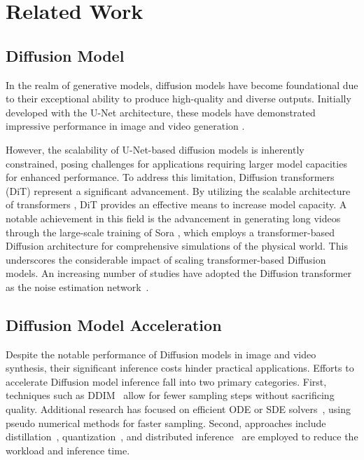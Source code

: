\section{Related Work}
\subsection{Diffusion Model}
%
In the realm of generative models, diffusion models \cite{ho2020denoising, sohl2015deep} have become foundational due to their exceptional ability to produce high-quality and diverse outputs. Initially developed with the U-Net architecture, these models have demonstrated impressive performance in image and video generation \cite{ramesh2022hierarchical, rombach2022high, ho2022video, saharia2022photorealistic, wei2024dreamvideo, wei2024dreamvideo2, wang2023modelscope, chen2023videocrafter1, chen2024videocrafter2}. 
%

However, the scalability of U-Net-based diffusion models is inherently constrained, posing challenges for applications requiring larger model capacities for enhanced performance. To address this limitation, Diffusion transformers (DiT) \cite{peebles2023scalable} represent a significant advancement. By utilizing the scalable architecture of transformers \cite{vaswani2017attention}, DiT provides an effective means to increase model capacity.
%
A notable achievement in this field is the advancement in generating long videos through the large-scale training of Sora \cite{Sora}, which employs a transformer-based Diffusion architecture for comprehensive simulations of the physical world. This underscores the considerable impact of scaling transformer-based Diffusion models.
%
An increasing number of studies have adopted the Diffusion transformer as the noise estimation network~\cite{chen2023pixart, chen2024pixart, Open-Sora, Open-Sora-Plan, ma2024latte, yang2024cogvideox}.

\subsection{Diffusion Model Acceleration}
%
Despite the notable performance of Diffusion models in image and video synthesis, their significant inference costs hinder practical applications. Efforts to accelerate Diffusion model inference fall into two primary categories. First, techniques such as DDIM~\cite{song2020denoising} allow for fewer sampling steps without sacrificing quality. Additional research has focused on efficient ODE or SDE solvers~\cite{song2019generative, jolicoeur2021gotta, lu2022dpm, karras2022elucidating, lu2022dpm++}, using pseudo numerical methods for faster sampling. Second, approaches include distillation~\cite{salimans2022progressive, wang2023videolcm}, quantization~\cite{li2024q, he2024ptqd, so2024temporal, shang2023post}, and distributed inference~\cite{li2024distrifusion} are employed to reduce the workload and inference time.  

